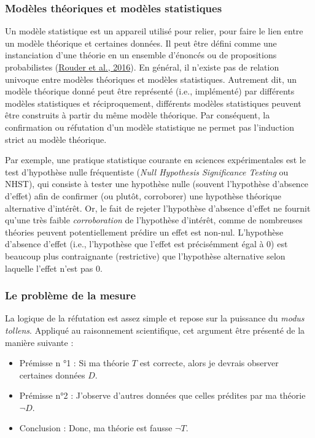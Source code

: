 \documentclass[
  a4paper,11pt,twoside,onecolumn,openright,final,oldfontcommands]{memoir}
\theoremstyle{definition}
\theoremstyle{definition}
\theoremstyle{definition}
\theoremstyle{definition}
\theoremstyle{remark}
\begin{document}
\hypertarget{moduxe8les-thuxe9oriques-et-moduxe8les-statistiques}{%
\subsubsection{Modèles théoriques et modèles statistiques}\label{moduxe8les-thuxe9oriques-et-moduxe8les-statistiques}}

Un modèle statistique est un appareil utilisé pour relier, pour faire le lien entre un modèle théorique et certaines données. Il peut être défini comme une instanciation d'une théorie en un ensemble d'énoncés ou de propositions probabilistes (\protect\hyperlink{ref-rouder_interplay_2016}{Rouder et al., 2016}). En général, il n'existe pas de relation univoque entre modèles théoriques et modèles statistiques. Autrement dit, un modèle théorique donné peut être représenté (i.e., implémenté) par différents modèles statistiques et réciproquement, différents modèles statistiques peuvent être construits à partir du même modèle théorique. Par conséquent, la confirmation ou réfutation d'un modèle statistique ne permet pas l'induction strict au modèle théorique.

Par exemple, une pratique statistique courante en sciences expérimentales est le test d'hypothèse nulle fréquentiste (\emph{Null Hypothesis Significance Testing} ou NHST), qui consiste à tester une hypothèse nulle (souvent l'hypothèse d'absence d'effet) afin de confirmer (ou plutôt, corroborer) une hypothèse théorique alternative d'intérêt. Or, le fait de rejeter l'hypothèse d'absence d'effet ne fournit qu'une très faible \emph{corroboration} de l'hypothèse d'intérêt, comme de nombreuses théories peuvent potentiellement prédire un effet est non-nul. L'hypothèse d'absence d'effet (i.e., l'hypothèse que l'effet est précisémment égal à \(0\)) est beaucoup plus contraignante (restrictive) que l'hypothèse alternative selon laquelle l'effet n'est pas \(0\).

\hypertarget{le-probluxe8me-de-la-mesure}{%
\subsubsection{Le problème de la mesure}\label{le-probluxe8me-de-la-mesure}}

La logique de la réfutation est assez simple et repose sur la puissance du \emph{modus tollens}. Appliqué au raisonnement scientifique, cet argument être présenté de la manière suivante :

\begin{itemize}
\item
  Prémisse n °1 : Si ma théorie \(T\) est correcte, alors je devrais observer certaines données \(D\).
\item
  Prémisse n°2 : J'observe d'autres données que celles prédites par ma théorie \(\lnot D\).
\item
  Conclusion : Donc, ma théorie est fausse \(\lnot T\).
\end{itemize}
\end{document}
